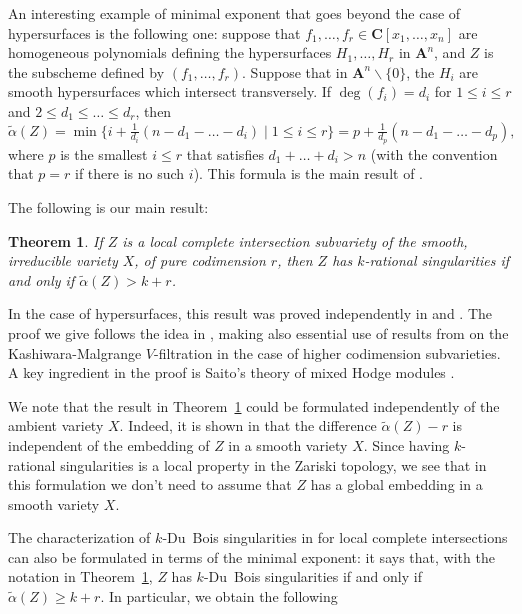 \documentclass[11pt]{article}
\numberwithin{equation}{section}
\theoremstyle{plain}
\newtheorem{thm}{Theorem}[section]
\theoremstyle{definition}
\begin{document}
An interesting example of minimal exponent that goes beyond the case of hypersurfaces is the following one: suppose that $f_1,\ldots,f_r\in {\mathbf C}[x_1,\ldots,x_n]$
are homogeneous polynomials defining the hypersurfaces $H_1,\ldots,H_r$ in ${\mathbf A}^n$, and $Z$ is the subscheme defined by $(f_1,\ldots,f_r)$.
Suppose that in ${\mathbf A}^n\smallsetminus\{0\}$, the $H_i$ are smooth hypersurfaces which
intersect transversely. If $\deg(f_i)=d_i$ for $1\leq i\leq r$ and $2\leq d_1\leq\ldots\leq d_r$, then
\[\widetilde{\alpha}(Z)=\min\big\{i+\tfrac{1}{d_i}(n-d_1-\ldots-d_i)\mid 1\leq i\leq r\big\}=p+\tfrac{1}{d_p}(n-d_1-\ldots-d_p),\]
where $p$ is the smallest $i\leq r$ that satisfies $d_1+\ldots+d_i>n$ (with the convention that $p=r$ if there is no such $i$). This formula is the main result of \cite{CDM}.

The following is our main result:

\begin{thm}\label{thm1_intro}
If $Z$ is a local complete intersection subvariety of the smooth, irreducible variety $X$, of pure codimension $r$, then $Z$ has $k$-rational singularities
if and only if $\widetilde{\alpha}(Z)>k+r$.
\end{thm}

In the case of hypersurfaces, this result was proved independently in \cite[App.]{FL2} and \cite{MP2}. The proof we give follows the idea in \cite[App.]{FL2},
making also essential use of results from \cite{CD} on the Kashiwara-Malgrange $V$-filtration in the case of higher codimension subvarieties. A key ingredient
in the proof is Saito's theory of mixed Hodge modules \cite{Saito_MHM}.

We note that the result in Theorem~\ref{thm1_intro} could be formulated independently of the ambient variety $X$. Indeed, it is shown in \cite[Prop.\,4.14]{CDMO}
that the difference $\widetilde{\alpha}(Z)-r$ is independent of the embedding of $Z$ in a smooth variety $X$. Since having $k$-rational singularities is a local property in the Zariski topology,
we see that in this formulation we don't need to assume that $Z$ has a global embedding in a smooth variety $X$.

The characterization of $k$-Du~Bois singularities in \cite{MP1} for local complete intersections can also be formulated in terms of the minimal exponent:
it says that, with the notation in Theorem~\ref{thm1_intro}, $Z$ has $k$-Du~Bois singularities if and only if $\widetilde{\alpha}(Z)\geq k+r$. In particular, we obtain the following
\end{document}
